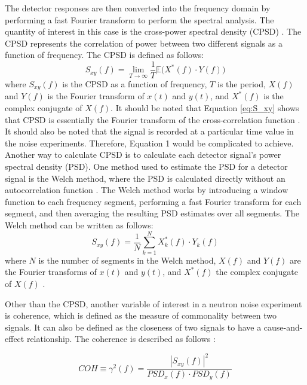 The detector responses are then converted into the frequency domain by performing a fast Fourier transform to perform the spectral analysis. The quantity of interest in this case is the cross-power spectral density (CPSD) \cite{ambrozicNoiseAnalysisTechniques2020}. The CPSD represents the correlation of power between two different signals as a function of frequency. The CPSD is defined as follows:
\begin{equation}
    S_{xy}(f) = \lim_{T \rightarrow \infty} \frac{1}{T} \mathbb{E} \bigg( X^*(f) \cdot Y(f) \bigg)
    \label{eq:S_xy}
\end{equation}
where $S_{xy} (f)$ is the CPSD as a function of frequency, $T$ is the period, $X(f)$ and $Y(f)$ is the Fourier transform of $x(t)$ and $y(t)$, and $X^* (f)$ is the complex conjugate of $X(f)$. It should be noted that Equation \ref{eq:S_xy} shows that CPSD is essentially the Fourier transform of the cross-correlation function \cite{thiePowerReactorNoise1981}. It should also be noted that the signal is recorded at a particular time value in the noise experiments. Therefore, Equation 1 would be complicated to achieve. Another way to calculate CPSD is to calculate each detector signal’s power spectral density (PSD). One method used to estimate the PSD for a detector signal is the Welch method, where the PSD is calculated directly without an autocorrelation function \cite{welchDirectDigitalMethod1961}. The Welch method works by introducing a window function to each frequency segment, performing a fast Fourier transform for each segment, and then averaging the resulting PSD estimates over all segments. The Welch method can be written as follows:
\begin{equation}
    S_{xy}(f) = \frac{1}{N} \sum_{k=1}^{N} X_k^*(f) \cdot Y_k(f)
\end{equation}
where $N$ is the number of segments in the Welch method, $X(f)$ and $Y(f)$ are the Fourier transforms of $x(t)$ and $y(t)$, and $X^* (f)$ the complex conjugate of $X(f)$ \cite{ambrozicNoiseAnalysisTechniques2020}.

Other than the CPSD, another variable of interest in a neutron noise experiment is coherence, which is defined as the measure of commonality between two signals. It can also be defined as the closeness of two signals to have a cause-and-effect relationship. The coherence is described as follows \cite{fryAnalysisNeutrondensityOscillations1975}:

\begin{equation}
    COH \equiv \gamma^2 (f) = \frac{|S_{xy} (f)|^2}{PSD_x (f) \cdot PSD_y (f)}
    \label{eq:COH}
\end{equation}

